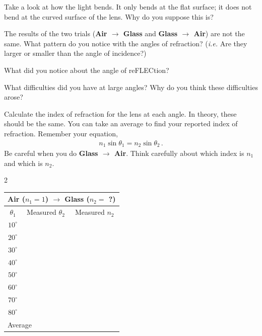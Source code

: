 \documentclass[10pt]{exam}
\begin{document}
\vspace{-1em}
\begin{questions}


  \question
    Take a look at how the light bends.  It only bends at the flat surface; it does not bend at the curved surface of the lens.  Why do you suppose this is? 
    \vs 

  \question
    The results of the two trials ({\bf Air $\rightarrow$ Glass} and {\bf Glass $\rightarrow$ Air}) are not the same.  What pattern do you notice with the angles of refraction? (\emph{i.e.} Are they larger or smaller than the angle of incidence?)
    \vs

  \question
    What did you notice about the angle of reFLECtion?
    \vs

\pagebreak

  \question
    What difficulties did you have at large angles?  Why do you think these difficulties arose?
    \vs[3] 

  \question
    Calculate the index of refraction for the lens at each angle.  In theory, these should be the same.  You can take an average to find your reported index of refraction.  Remember your equation,
    \begin{align*}
      n_1 \sin \theta_1 = n_2 \sin \theta_2 \, .
    \end{align*}
    Be careful when you do {\bf Glass $\rightarrow$ Air}.  Think carefully about which index is $n_1$ and which is $n_2$.  \vs[2]
    
    \begin{multicols}{2}
      \begin{tabular}{|c|c|c|}
        \hline
        \multicolumn{3}{|c|}{{\bf Air ($n_1=1$) $\rightarrow$ Glass ($n_2=$ ?)}} 
        \\\hline
        $\theta_1$ &
        Measured $\theta_2$ &
        Measured $n_2$ \\\hline
        $10^\circ$ && \\\hline
        $20^\circ$ && \\\hline
        $30^\circ$ && \\\hline
        $40^\circ$ && \\\hline
        $50^\circ$ && \\\hline
        $60^\circ$ && \\\hline
        $70^\circ$ && \\\hline
        $80^\circ$ && \\\hline
        \multicolumn{2}{|l|}{Average} & \\\hline
      \end{tabular}


\end{multicols}
\end{questions}
\end{document}
